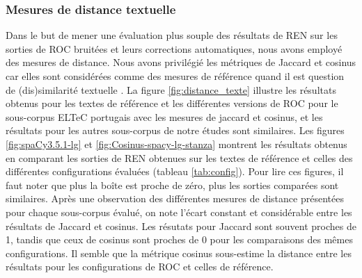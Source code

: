 \subsubsection{Mesures de distance textuelle}
\label{sec:distances_creux}
Dans le but de mener une évaluation plus souple des résultats de REN sur les sorties de ROC bruitées et leurs corrections automatiques, nous avons employé des mesures de distance. Nous avons privilégié les métriques de Jaccard et cosinus car elles sont considérées comme des mesures de référence quand il est question de (dis)similarité textuelle \cite{buscaldi2020calcul}. La figure \ref{fig:distance_texte} illustre les résultats obtenus pour les textes de référence et les différentes versions de ROC pour le sous-corpus ELTeC portugais avec les mesures de jaccard et cosinus, et les résultats pour les autres sous-corpus de notre études sont similaires. Les figures \ref{fig:spaCy3.5.1-lg} et \ref{fig:Cosinus-spacy-lg-stanza} montrent les résultats obtenus en comparant les sorties de REN obtenues sur les textes de référence et celles des différentes configurations évaluées (tableau \ref{tab:config}). Pour lire ces figures, il faut noter que plus la boîte est proche de zéro, plus les sorties comparées sont similaires.
Après une observation des différentes mesures de distance présentées pour chaque sous-corpus évalué, on note l'écart constant et considérable entre les résultats de Jaccard et cosinus. Les résutats pour Jaccard sont souvent proches de 1, tandis que ceux de cosinus sont proches de 0 pour les comparaisons des mêmes configurations. Il semble que la métrique cosinus sous-estime la distance entre les résultats pour les configurations de ROC et celles de référence. 

